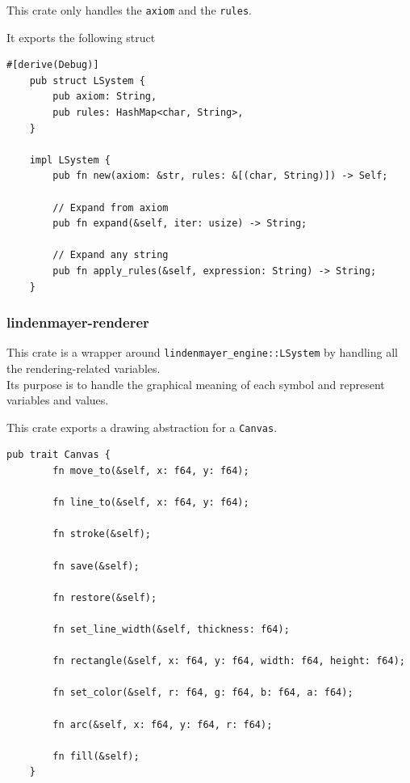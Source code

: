 \documentclass[a4paper]{article}
\begin{document}
This crate only handles the \texttt{axiom}
and the \texttt{rules}.

It exports the following struct

\begin{lstlisting}[style=Rust, style=boxed]
    #[derive(Debug)]
    pub struct LSystem {
        pub axiom: String,
        pub rules: HashMap<char, String>,
    }
    
    impl LSystem {
        pub fn new(axiom: &str, rules: &[(char, String)]) -> Self;

        // Expand from axiom
        pub fn expand(&self, iter: usize) -> String;
    
        // Expand any string
        pub fn apply_rules(&self, expression: String) -> String;
    }
\end{lstlisting}

\subsubsection{lindenmayer-renderer}

This crate is a wrapper around \texttt{lindenmayer\_engine::LSystem}
by handling all the rendering-related variables. \\
Its purpose is to handle the graphical meaning of each symbol
and represent variables and values.

This crate exports a drawing abstraction for a \texttt{Canvas}.

\begin{lstlisting}[style=Rust, style=boxed]
    pub trait Canvas {
        fn move_to(&self, x: f64, y: f64);

        fn line_to(&self, x: f64, y: f64);
    
        fn stroke(&self);
    
        fn save(&self);
    
        fn restore(&self);
    
        fn set_line_width(&self, thickness: f64);
    
        fn rectangle(&self, x: f64, y: f64, width: f64, height: f64);
    
        fn set_color(&self, r: f64, g: f64, b: f64, a: f64);
    
        fn arc(&self, x: f64, y: f64, r: f64);
    
        fn fill(&self);
    }
\end{lstlisting}

\pagebreak
\end{document}
